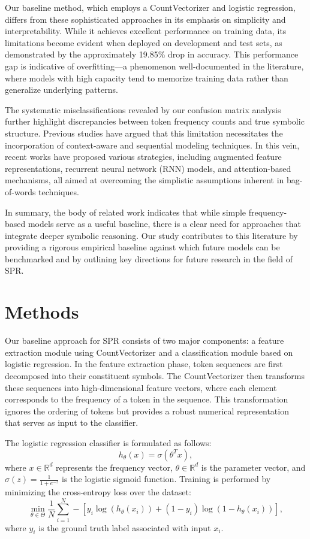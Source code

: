 \documentclass{article}
\begin{document}
Our baseline method, which employs a CountVectorizer and logistic regression, differs from these sophisticated approaches in its emphasis on simplicity and interpretability. While it achieves excellent performance on training data, its limitations become evident when deployed on development and test sets, as demonstrated by the approximately 19.85\% drop in accuracy. This performance gap is indicative of overfitting—a phenomenon well-documented in the literature, where models with high capacity tend to memorize training data rather than generalize underlying patterns.

The systematic misclassifications revealed by our confusion matrix analysis further highlight discrepancies between token frequency counts and true symbolic structure. Previous studies have argued that this limitation necessitates the incorporation of context-aware and sequential modeling techniques. In this vein, recent works have proposed various strategies, including augmented feature representations, recurrent neural network (RNN) models, and attention-based mechanisms, all aimed at overcoming the simplistic assumptions inherent in bag-of-words techniques.

In summary, the body of related work indicates that while simple frequency-based models serve as a useful baseline, there is a clear need for approaches that integrate deeper symbolic reasoning. Our study contributes to this literature by providing a rigorous empirical baseline against which future models can be benchmarked and by outlining key directions for future research in the field of SPR.

\section{Methods}
Our baseline approach for SPR consists of two major components: a feature extraction module using CountVectorizer and a classification module based on logistic regression. In the feature extraction phase, token sequences are first decomposed into their constituent symbols. The CountVectorizer then transforms these sequences into high-dimensional feature vectors, where each element corresponds to the frequency of a token in the sequence. This transformation ignores the ordering of tokens but provides a robust numerical representation that serves as input to the classifier.

The logistic regression classifier is formulated as follows:
\[
h_\theta(x) = \sigma(\theta^T x),
\]
where \(x \in \mathbb{R}^d\) represents the frequency vector, \(\theta \in \mathbb{R}^d\) is the parameter vector, and \(\sigma(z)=\frac{1}{1+e^{-z}}\) is the logistic sigmoid function. Training is performed by minimizing the cross-entropy loss over the dataset:
\[
\min_{\theta \in \Theta} \frac{1}{N} \sum_{i=1}^{N} -\left[ y_i \log(h_\theta(x_i)) + (1-y_i) \log(1-h_\theta(x_i)) \right],
\]
where \(y_i\) is the ground truth label associated with input \(x_i\).
\end{document}
